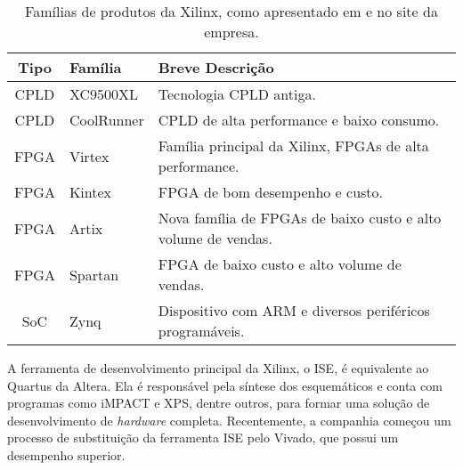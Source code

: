 \documentclass[11pt,a4paper,oneside]{book}
\begin{document}
\begin{table}[h]
\centering
\begin{tabular}{|c|l|p{6.5cm}|}
\hline
Tipo & Fam\'i­lia & Breve Descri\c{c}\~ao \\ \hline
CPLD & XC9500XL & Tecnologia CPLD antiga. \\ \hline
CPLD & CoolRunner & CPLD de alta performance e baixo consumo. \\ \hline
FPGA & Virtex & Fam\'i­lia principal da Xilinx, FPGAs de alta performance. \\ \hline
FPGA & Kintex & FPGA de bom desempenho e custo. \\ \hline
FPGA & Artix & Nova família de FPGAs de baixo custo e alto volume de vendas. \\ \hline
FPGA & Spartan & FPGA de baixo custo e alto volume de vendas. \\ \hline
SoC & Zynq & Dispositivo com ARM e diversos periféricos programáveis. \\ \hline
\end{tabular}
\caption{Fam\'i­lias de produtos da Xilinx, como apresentado em \cite{Woods2008} e no site da empresa.}
\label{tab:xilinx}
\end{table}

A ferramenta de desenvolvimento principal da Xilinx, o ISE, é equivalente ao Quartus da Altera.
Ela é responsável pela síntese dos esquemáticos e conta com programas como iMPACT e XPS, dentre outros, para formar uma solução de desenvolvimento de \textit{hardware} completa.
Recentemente, a companhia começou um processo de substituição da ferramenta ISE pelo Vivado, que possui um desempenho superior.


\ifx\compilewholereport\undefined
	 
	\newsavebox\mytempbib\savebox\mytempbib{\parbox{\textwidth}{}}
	\listoftodos
	
\end{document}
